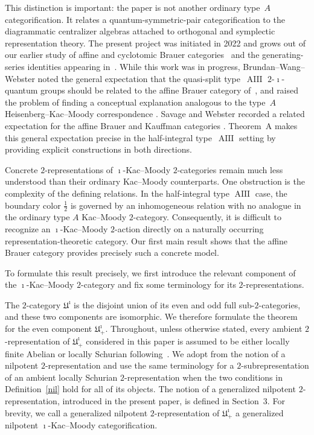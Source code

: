 \documentclass[a4,10pt]{amsart}
\numberwithin{equation}{section}
\theoremstyle{definition}
\begin{document}
This distinction is important: the paper is not another ordinary
type~$A$ categorification. It relates a quantum-symmetric-pair
categorification to the diagrammatic centralizer algebras attached to
orthogonal and symplectic representation theory. The present project
was initiated in 2022 and grows out of our earlier study of affine and
cyclotomic Brauer categories~\cite{RS-cyc} and the generating-series
identities appearing in~\cite{GRS-tri}. While this work was in progress,
Brundan--Wang--Webster noted the general expectation that the
quasi-split type~$\operatorname{AIII}$ $2$-$\imath$-quantum groups
should be related to the affine Brauer category of~\cite{RS-cyc}, and
raised the problem of finding a conceptual explanation analogous to
the type~$A$ Heisenberg--Kac--Moody correspondence
\cite[Introduction, pp.~5--6]{BWW25}. Savage and Webster recorded a
related expectation for the affine Brauer and Kauffman categories
\cite[Introduction]{SW}. Theorem~A makes this general expectation
precise in the half-integral type~$\operatorname{AIII}$ setting by
providing explicit constructions in both directions.




Concrete $2$-representations of $\imath$-Kac--Moody $2$-categories remain much less understood than their ordinary Kac--Moody counterparts. One obstruction is the complexity of the defining relations. In the half-integral type $\operatorname{AIII}$ case, the boundary color $\frac12$ is governed by an inhomogeneous relation with no analogue in the ordinary type $A$ Kac--Moody $2$-category. Consequently, it is difficult to recognize an $\imath$-Kac--Moody $2$-action directly on a naturally occurring representation-theoretic category. Our first main result shows that the affine Brauer category provides precisely such a concrete model.

To formulate this result precisely, we first introduce  the relevant component of the
$\imath$-Kac--Moody $2$-category and fix some terminology for its $2$-representations.

The $2$-category $\mathfrak U^\imath$ is the
disjoint union of its even and odd full sub-$2$-categories, and these two
components are isomorphic. We therefore formulate the theorem for the even
component $\mathfrak U^\imath_+$. 
Throughout, unless otherwise stated, every ambient
$2$-representation of $\mathfrak U^\imath_+$ considered in this
paper is assumed to be either locally finite Abelian or locally
Schurian  following~\cite{BSW-heisenberg}.
We adopt from  \cite{BSW-heisenberg} the notion of a nilpotent $2$-representation
and use the same terminology for a  $2$-subrepresentation of an ambient locally
Schurian $2$-representation when  
the two conditions in Definition~\ref{nil} hold for all of its objects.
The notion of a generalized nilpotent
$2$-representation, introduced in the present paper, is defined in
Section~3. For brevity, we call a generalized nilpotent
$2$-representation of $\mathfrak U^\imath_+$ a generalized nilpotent
$\imath$-Kac--Moody categorification.
\end{document}
